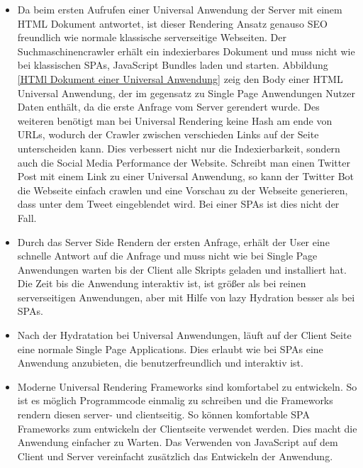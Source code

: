 \documentclass[runningheads]{llncs}
\begin{document}
\begin{itemize}
  \setlength\itemsep{1em}
  \item Da beim ersten Aufrufen einer Universal Anwendung der Server mit einem HTML Dokument antwortet, 
  ist dieser Rendering Ansatz genauso SEO freundlich wie normale klassische serverseitige Webseiten. 
  Der Suchmaschinencrawler erhält ein indexierbares Dokument und muss nicht wie bei klassischen SPAs, 
  JavaScript Bundles laden und starten. 
  Abbildung \ref{HTMl Dokument einer Universal Anwendung}
  zeig den Body einer HTML Universal Anwendung, der im gegensatz zu Single Page Anwendungen Nutzer Daten
  enthält, da die erste Anfrage vom Server gerendert wurde.
  Des weiteren benötigt man bei Universal Rendering keine Hash am ende von URLs, 
  wodurch der Crawler zwischen verschieden Links auf der Seite unterscheiden kann. 
  Dies verbessert nicht nur die Indexierbarkeit, 
  sondern auch die Social Media Performance der Website. 
  Schreibt man einen Twitter Post mit einem Link zu einer Universal Anwendung, 
  so kann der Twitter Bot die Webseite einfach crawlen und eine Vorschau zu der Webseite generieren, 
  dass unter dem Tweet eingeblendet wird. 
  Bei einer SPAs ist dies nicht der Fall.
  \item Durch das Server Side Rendern der ersten Anfrage, 
  erhält der User eine schnelle Antwort auf die Anfrage und 
  muss nicht wie bei Single Page Anwendungen warten bis der Client alle Skripts geladen und 
  installiert hat. Die Zeit bis die Anwendung interaktiv ist, 
  ist größer als bei reinen serverseitigen Anwendungen, 
  aber mit Hilfe von lazy Hydration besser als bei SPAs. 
  \item Nach der Hydratation bei Universal Anwendungen, 
  läuft auf der Client Seite eine normale Single Page Applications. 
  Dies erlaubt wie bei SPAs eine Anwendung anzubieten, 
  die benutzerfreundlich und interaktiv ist.
  \item Moderne Universal Rendering Frameworks sind komfortabel zu entwickeln. 
  So ist es möglich Programmcode einmalig zu schreiben und 
  die Frameworks rendern diesen server- und clientseitig. 
  So können komfortable SPA Frameworks zum entwickeln der Clientseite verwendet werden. 
  Dies macht die Anwendung einfacher zu Warten. 
  Das Verwenden von JavaScript auf dem Client und 
  Server vereinfacht zusätzlich das Entwickeln der Anwendung.
\end{itemize}
\end{document}
